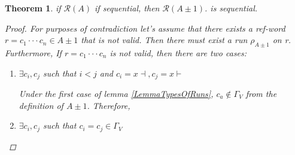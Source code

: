 \documentclass{article}
\newtheorem{theorem}{Theorem}
\begin{document}
\begin{theorem} \label{TheoremAutomatonPM1}
    if $\mathcal{R}(A)$ if sequential, then $\mathcal{R}(A \pm 1)$.
    is sequential.
    
    \begin{proof}
	For purposes of contradiction let's assume that there exists
	a ref-word $r = c_1 \cdot \cdot\cdot c_n \in A \pm 1$ that
	is not valid. Then there must exist a run $\rho_{A\pm 1}$
	on r. Furthermore, If $r = c_1 \cdot\cdot\cdot c_n$ is not
	valid, then there are two cases:
    \begin{enumerate}
	    \item $\exists c_i, c_j$ such that $i < j$ and $c_i =
            x\dashv, c_j = x\vdash$

    Under the first case of lemma \ref{LemmaTypesOfRuns}, $c_a \not \in \Gamma_V$ from the definition of $A \pm 1$. Therefore, 

            \item $\exists c_i, c_j$ such that $c_i = c_j \in \Gamma_V$
        \end{enumerate}
    \end{proof}
\end{theorem}
\end{document}
